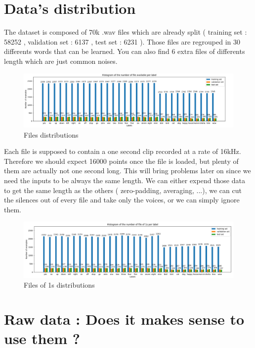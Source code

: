 \section{Data's distribution}

The dataset is composed of 70k .wav files which are already split ( training set : 58252 , validation set : 6137 , test set : 6231 ). Those files are regrouped in 30 differents words that can be learned. You can also find 6 extra files of differents length which are just common noises.


\begin{figure}[!h]
    \centering
    \includegraphics[width=1\textwidth]{chapters/pictures/histo_all.PNG}
    \caption{Files distributions}
    \label{fig:init_dist}
\end{figure}


Each file is supposed to contain a one second clip recorded at a rate of 16kHz. Therefore we should expect 16000 points once the file is loaded, but plenty of them are actually not one second long. This will bring problems later on since we need the inputs to be always the same length. We can either expend those data to get the same length as the others ( zero-padding, averaging, ...), we can cut the silences out of every file and take only the voices, or we can simply ignore them.



\begin{figure}[!h]
    \centering
    \includegraphics[width=1\textwidth]{chapters/pictures/histo_all_1s.PNG}
    \caption{Files of 1s distributions}
    \label{fig:init_dist_1s}
\end{figure}

\newpage

\section{Raw data : Does it makes sense to use them ?}

